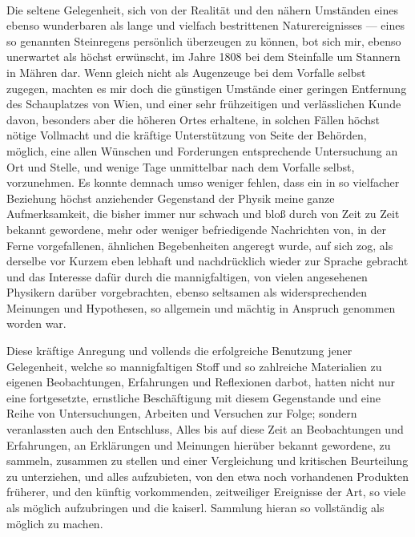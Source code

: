 \documentclass[a4paper, 11pt, oneside, german]{article}
\begin{document}
\paragraph{}
Die seltene Gelegenheit, sich von der Realität und den nähern Umständen eines ebenso wunderbaren als lange und vielfach bestrittenen Naturereignisses --- eines so genannten Steinregens persönlich überzeugen zu können, bot sich mir, ebenso unerwartet als höchst erwünscht, im Jahre 1808 bei dem Steinfalle um Stannern in Mähren dar. Wenn gleich nicht als Augenzeuge bei dem Vorfalle selbst zugegen, machten es mir doch die günstigen Umstände einer geringen Entfernung des Schauplatzes von Wien, und einer sehr frühzeitigen und verlässlichen Kunde davon, besonders aber die höheren Ortes erhaltene, in solchen Fällen höchst nötige Vollmacht und die kräftige Unterstützung von Seite der Behörden, möglich, eine allen Wünschen und Forderungen entsprechende Untersuchung an Ort und Stelle, und wenige Tage unmittelbar nach dem Vorfalle selbst, vorzunehmen. Es konnte demnach umso weniger fehlen, dass ein in so vielfacher Beziehung höchst anziehender Gegenstand der Physik meine ganze Aufmerksamkeit, die bisher immer nur schwach und bloß durch von Zeit zu Zeit bekannt gewordene, mehr oder weniger befriedigende Nachrichten von, in der Ferne vorgefallenen, ähnlichen Begebenheiten angeregt wurde, auf sich zog, als derselbe vor Kurzem eben lebhaft und nachdrücklich wieder zur Sprache gebracht und das Interesse dafür durch die mannigfaltigen, von vielen angesehenen Physikern darüber vorgebrachten, ebenso seltsamen als widersprechenden Meinungen und Hypothesen, so allgemein und mächtig in Anspruch genommen worden war.

Diese kräftige Anregung und vollends die erfolgreiche Benutzung jener Gelegenheit, welche so mannigfaltigen Stoff und so zahlreiche Materialien zu eigenen Beobachtungen, Erfahrungen und Reflexionen darbot, hatten nicht nur eine fortgesetzte, ernstliche Beschäftigung mit diesem Gegenstande und eine Reihe von Untersuchungen, Arbeiten und Versuchen zur Folge; sondern veranlassten auch den Entschluss, Alles bis auf diese Zeit an Beobachtungen und Erfahrungen, an Erklärungen und Meinungen hierüber bekannt gewordene, zu sammeln, zusammen zu stellen und einer Vergleichung und kritischen Beurteilung zu unterziehen, und alles aufzubieten, von den etwa noch vorhandenen Produkten früherer, und den künftig vorkommenden, zeitweiliger Ereignisse der Art, so viele als möglich aufzubringen und die kaiserl. Sammlung hieran so vollständig als möglich zu machen.
\end{document}
